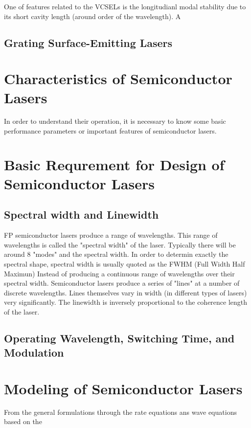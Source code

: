 One of features related to the VCSELs is the longitudianl modal stability due
to its short cavity length (around order of the wavelength). A

\subsection{Grating Surface-Emitting Lasers}
\section{Characteristics of Semiconductor Lasers} \label{corrections}

In order to understand their operation, it is necessary to know some basic
performance parameters or important features of semiconductor lasers.

\section{Basic Requrement for Design of Semiconductor Lasers} \label{corrections}
\subsection{Spectral width and Linewidth}

FP semiconductor lasers produce a range of wavelengths. This range of
wavelengths is called the "spectral width" of the laser. Typically there will
be around 8 "modes" and the spectral width. In order to determin exactly the
spectral shape, spectral width is usually quoted as the FWHM (Full Width Half
Maximun) Instead of producing a continuous range of wavelengths over their
spectral width. Semiconductor lasers produce a series of "lines" at a number of
discrete wavelengths. Lines themselves vary in width (in different types of
lasers) very significantly. The linewidth is inversely proportional to the
coherence length of the laser.

\subsection{Operating Wavelength, Switching Time, and Modulation}
\section{Modeling of Semiconductor Lasers} \label{corrections}

From the general formulations through the rate equations ans wave equations
based on the

